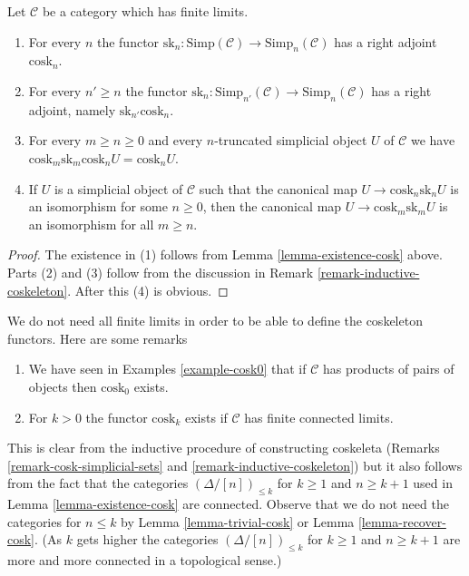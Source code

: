 \begin{lemma}
\label{lemma-cosk-up}
Let $\mathcal{C}$ be a category which has finite limits.
\begin{enumerate}
\item For every $n$ the functor $\text{sk}_n : \text{Simp}(\mathcal{C})
\to \text{Simp}_n(\mathcal{C})$ has a right adjoint $\text{cosk}_n$.
\item For every $n' \geq n$ the functor
$\text{sk}_n : \text{Simp}_{n'}(\mathcal{C}) \to \text{Simp}_n(\mathcal{C})$
has a right adjoint, namely $\text{sk}_{n'}\text{cosk}_n$.
\item For every $m \geq n \geq 0$ and every $n$-truncated simplicial
object $U$ of $\mathcal{C}$ we have
$\text{cosk}_m \text{sk}_m \text{cosk}_n U = \text{cosk}_n U$.
\item If $U$ is a simplicial object of $\mathcal{C}$ such that
the canonical map
$U \to \text{cosk}_n \text{sk}_nU$
is an isomorphism for some $n \geq 0$, then the canonical map
$U \to \text{cosk}_m \text{sk}_mU$
is an isomorphism for all $m \geq n$.
\end{enumerate}
\end{lemma}

\begin{proof}
The existence in (1) follows from Lemma \ref{lemma-existence-cosk} above.
Parts (2) and (3) follow from the discussion
in Remark \ref{remark-inductive-coskeleton}. After this (4) is obvious.
\end{proof}

\begin{remark}
\label{remark-existence-cosk}
We do not need all finite limits in order to be able to define
the coskeleton functors. Here are some remarks
\begin{enumerate}
\item We have seen in Examples \ref{example-cosk0} that if $\mathcal{C}$
has products of pairs of objects then $\text{cosk}_0$ exists.
\item For $k > 0$ the functor $\text{cosk}_k$ exists if
$\mathcal{C}$ has finite connected limits.
\end{enumerate}
This is clear from the inductive procedure of constructing coskeleta
(Remarks \ref{remark-cosk-simplicial-sets} and
\ref{remark-inductive-coskeleton}) but it also follows from the fact that
the categories $(\Delta/[n])_{\leq k}$ for $k \geq 1$ and
$n \geq k + 1$ used in Lemma \ref{lemma-existence-cosk}
are connected. Observe that we do not need the categories
for $n \leq k$ by Lemma \ref{lemma-trivial-cosk} or
Lemma \ref{lemma-recover-cosk}. (As $k$ gets higher the categories
$(\Delta/[n])_{\leq k}$ for $k \geq 1$ and $n \geq k + 1$ are more
and more connected in a topological sense.)
\end{remark}

